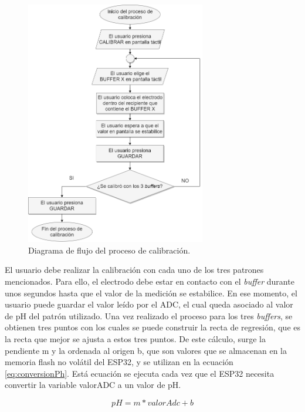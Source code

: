 \begin{figure}[htbp]
	\centering
	\includegraphics[width=0.7\textwidth]{./Figures/procesoCalibracion.png}
	\caption{Diagrama de flujo del proceso de calibración.}
	\label{fig:procesoCalibracion}
\end{figure}

\vspace{1,5 cm}

El usuario debe realizar la calibración con cada uno de los tres patrones mencionados. Para ello, el electrodo debe estar en contacto con el \textit{buffer} durante unos segundos hasta que el valor de la medición se estabilice. En ese momento, el usuario puede guardar el valor leído por el ADC, el cual queda asociado al valor de pH del patrón utilizado. Una vez realizado el proceso para los tres \textit{buffers}, se obtienen tres puntos con los cuales se puede construir la recta de regresión, que es la recta que mejor se ajusta a estos tres puntos. De este cálculo, surge la pendiente m y la ordenada al origen b, que son valores que se almacenan en la memoria flash no volátil del ESP32, y se utilizan en la ecuación \ref{eq:conversionPh}. Está ecuación se ejecuta cada vez que el ESP32 necesita convertir la variable valorADC a un valor de pH.

\begin{equation}
	\label{eq:conversionPh}
pH = m * valorAdc + b
\end{equation}


